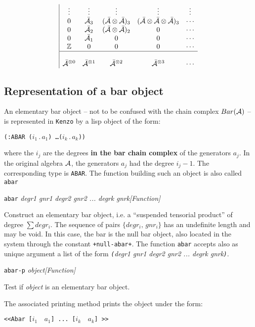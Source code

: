 $$\begin{array}{|ccccc}
              \vdots & \vdots & \vdots &\vdots & \vdots \\
              0 & \bar{\cal A}_3 & (\bar{\cal A} \otimes \bar{\cal A})_3 &
             (\bar{\cal A}\otimes \bar{\cal A}\otimes\bar{\cal A})_3 & \cdots \\
              0 & \bar{\cal A}_2 & (\bar{\cal A}\otimes\bar{\cal A})_2 & 0 & \cdots \\
              0 & \bar{\cal A}_1 & 0 & 0 & \cdots \\
              {\mathbb{Z}} & 0 & 0 & 0 & \cdots \\ \hline
                   &   &   &   &    \\
             \bar{\cal A}^{\otimes 0} & \bar{\cal A}^{\otimes 1} & \bar{\cal A}^{\otimes 2} &
             \bar{\cal A}^{\otimes 3} & \cdots
\end{array} $$

\subsection {Representation of a bar object}

An elementary bar object
-- not to be confused with the chain complex $Bar({\cal A})$ --
is represented in {\tt Kenzo} by a lisp object of the form:

\begin{center} {\tt (:ABAR  ($i_1\, . \, a_1$) \ldots ($i_k\, . \, a_k$))} \end{center}
where the $i_j$ are the degrees {\bf in the bar chain complex} of the generators $a_j$.
In the original algebra $\cal A$, the generators $a_j$ had the degree $i_j-1$.
The corresponding type is {\tt ABAR}.
The function  building such an object is also called {\tt abar}
\vskip 0.35cm
{\parindent=0mm
{\leftskip=5mm
{\tt abar} {\em  degr1 gnr1 degr2 gnr2 ... degrk gnrk}\hfill {\em [Function]} \par}
{\leftskip=15mm
Construct an elementary bar object, i.e. a ``suspended tensorial product'' of degree $\sum degr_i$. The sequence of pairs
$\lbrace degr_i,\,  gnr_i \rbrace$ has an undefinite length and  may be void. In this case,  the bar
is the null bar object, also located in the system through the constant {\tt +null-abar+}. The function
{\tt abar} accepts also as unique argument a list of the form
{\em  {\tt (}degr1 gnr1 degr2 gnr2 ... degrk gnrk{\tt )}}.   \par}
{\leftskip=5mm
{\tt abar-p} {\em object}\hfill {\em [Function]} \par}
{\leftskip=15mm
Test if {\em object} is an elementary bar object. \par}
}
\vskip 0.35cm
The associated printing  method prints the object under the form:
\begin{center}
{\tt <<Abar [$i_1\quad a_1$] ... [$i_k\quad a_k$] >>}
\end{center}

